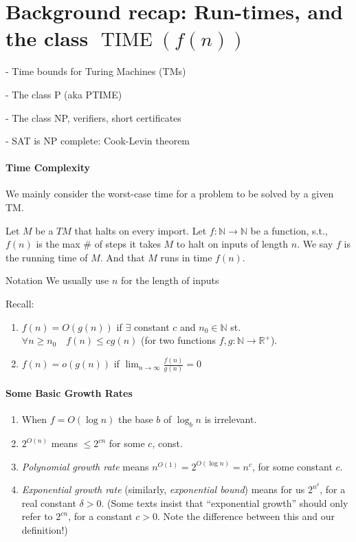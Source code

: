 \section{Background recap: Run-times, and the class
 $\operatorname{TIME}(f(n))$}

- Time bounds for Turing Machines (TMs)

- The class P (aka PTIME)

- The class NP, verifiers, short certificates

- SAT is NP complete: Cook-Levin theorem



\paragraph{Time Complexity}
We mainly consider the worst-case time for a problem to be solved by a given TM.

\begin{definition}
    Let $M$ be a $T M$ that halts on every import. Let $f: \mathbb{N} \rightarrow \mathbb{N}$ be a function, s.t., $f(n)$ is the max \# of steps it takes $M$ to halt on inputs of length $n$. We say $f$ is the running time of $M$. And that $M$ runs in time $f(n)$.
\end{definition}

\begin{trailer}{Notation}
    We usually use $n$ for the length of inputs


Recall:
\begin{enumerate}
    \item 
 $f(n)=O(g(n))$ if $\exists$ constant $c$ and $n_0 \in \mathbb{N}$ st. $\forall n \geqslant n_0 \quad f(n) \leqslant c g(n) $ (for two functions  $f, g: \mathbb{N} \rightarrow \mathbb{R}^{+}$).

\item $f(n)=o(g(n))$ if $\lim _{n \rightarrow \infty} \frac{f(n)}{g(n)}=0$
\end{enumerate}
\end{trailer}


\paragraph{Some Basic Growth Rates}
\begin{enumerate}
    \item When $f=O\left(\log n\right)$ the base $b$ of $\log _b n$ is irrelevant.
    
    \item $2^{O(n)}$ means $\leqslant 2^{c n}$ for some $c$, const.

    \item \emph{Polynomial growth rate} means $n^{O(1)}=2^{O\left(\log n\right)}=n^c$, for some constant $c$.
    \item \emph{Exponential growth rate} (similarly, \emph{exponential bound})  means for us $2^{n^\delta}$, for a real constant $\delta>0$. (Some texts insist that ``exponential growth'' should only refer to $2^{cn}$, for a constant $c>0$. Note the difference between this and our definition!)
\end{enumerate}
